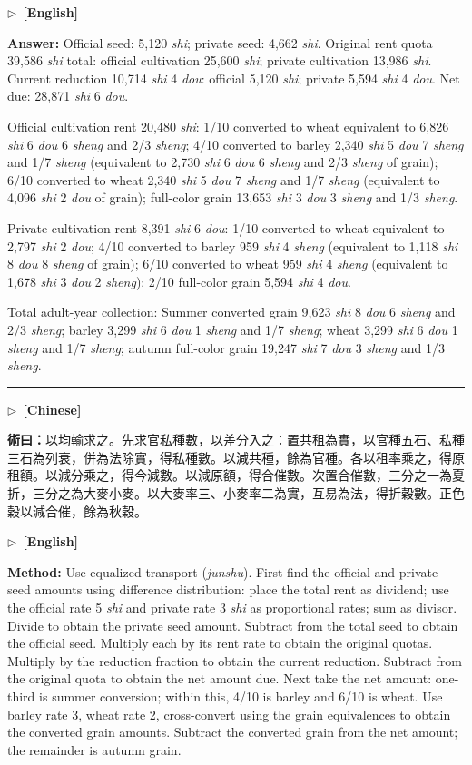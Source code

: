 \documentclass[10pt,a4paper]{article}
\newcommand{\longline}{\par\noindent\rule{\textwidth}{0.4pt}\par}
\newcommand{\CNmarker}{\noindent\textcolor{cnlabel}{$\triangleright$\ \textbf{[Chinese]}}\par}
\newcommand{\ENmarker}{\noindent\textcolor{enlabel}{$\triangleright$\ \textbf{[English]}}\par}
\newcommand{\Method}[1]{\par\noindent\textbf{\color{methodcolor}術曰：}#1\par}
\newcommand{\AnswerEn}[1]{\par\noindent\textbf{\color{answercolor}Answer:} #1\par}
\newcommand{\MethodEn}[1]{\par\noindent\textbf{\color{methodcolor}Method:} #1\par}
\begin{document}
\ENmarker
\AnswerEn{Official seed: 5,120 \textit{shi}; private seed: 4,662 \textit{shi}. Original rent quota 39,586 \textit{shi} total: official cultivation 25,600 \textit{shi}; private cultivation 13,986 \textit{shi}. Current reduction 10,714 \textit{shi} 4 \textit{dou}: official 5,120 \textit{shi}; private 5,594 \textit{shi} 4 \textit{dou}. Net due: 28,871 \textit{shi} 6 \textit{dou}.

Official cultivation rent 20,480 \textit{shi}: 1/10 converted to wheat equivalent to 6,826 \textit{shi} 6 \textit{dou} 6 \textit{sheng} and 2/3 \textit{sheng}; 4/10 converted to barley 2,340 \textit{shi} 5 \textit{dou} 7 \textit{sheng} and 1/7 \textit{sheng} (equivalent to 2,730 \textit{shi} 6 \textit{dou} 6 \textit{sheng} and 2/3 \textit{sheng} of grain); 6/10 converted to wheat 2,340 \textit{shi} 5 \textit{dou} 7 \textit{sheng} and 1/7 \textit{sheng} (equivalent to 4,096 \textit{shi} 2 \textit{dou} of grain); full-color grain 13,653 \textit{shi} 3 \textit{dou} 3 \textit{sheng} and 1/3 \textit{sheng}.

Private cultivation rent 8,391 \textit{shi} 6 \textit{dou}: 1/10 converted to wheat equivalent to 2,797 \textit{shi} 2 \textit{dou}; 4/10 converted to barley 959 \textit{shi} 4 \textit{sheng} (equivalent to 1,118 \textit{shi} 8 \textit{dou} 8 \textit{sheng} of grain); 6/10 converted to wheat 959 \textit{shi} 4 \textit{sheng} (equivalent to 1,678 \textit{shi} 3 \textit{dou} 2 \textit{sheng}); 2/10 full-color grain 5,594 \textit{shi} 4 \textit{dou}.

Total adult-year collection: Summer converted grain 9,623 \textit{shi} 8 \textit{dou} 6 \textit{sheng} and 2/3 \textit{sheng}; barley 3,299 \textit{shi} 6 \textit{dou} 1 \textit{sheng} and 1/7 \textit{sheng}; wheat 3,299 \textit{shi} 6 \textit{dou} 1 \textit{sheng} and 1/7 \textit{sheng}; autumn full-color grain 19,247 \textit{shi} 7 \textit{dou} 3 \textit{sheng} and 1/3 \textit{sheng}.}

\longline

\CNmarker
\Method{以均輸求之。先求官私種數，以差分入之：置共租為實，以官種五石、私種三石為列衰，併為法除實，得私種數。以減共種，餘為官種。各以租率乘之，得原租額。以減分乘之，得今減數。以減原額，得合催數。次置合催數，三分之一為夏折，三分之為大麥小麥。以大麥率三、小麥率二為實，互易為法，得折穀數。正色穀以減合催，餘為秋穀。}

\ENmarker
\MethodEn{Use equalized transport (\textit{junshu}). First find the official and private seed amounts using difference distribution: place the total rent as dividend; use the official rate 5 \textit{shi} and private rate 3 \textit{shi} as proportional rates; sum as divisor. Divide to obtain the private seed amount. Subtract from the total seed to obtain the official seed. Multiply each by its rent rate to obtain the original quotas. Multiply by the reduction fraction to obtain the current reduction. Subtract from the original quota to obtain the net amount due. Next take the net amount: one-third is summer conversion; within this, 4/10 is barley and 6/10 is wheat. Use barley rate 3, wheat rate 2, cross-convert using the grain equivalences to obtain the converted grain amounts. Subtract the converted grain from the net amount; the remainder is autumn grain.}
\end{document}
